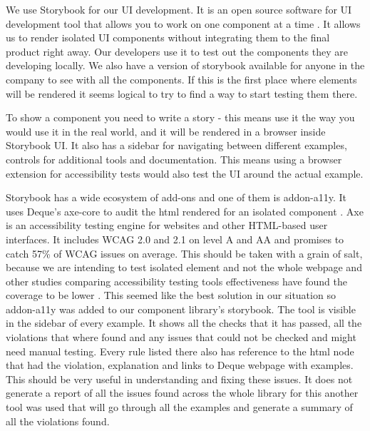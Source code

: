 \documentclass{master_thesis}
\begin{document}
We use Storybook for our UI development. It is an open source software for UI development tool that allows you to work on one component at a time \citep{storybook}. It allows us to render isolated UI components without integrating them to the final product right away. Our developers use it to test out the components they are developing locally. We also have a version of storybook available for anyone in the company to see with all the components. If this is the first place where elements will be rendered it seems logical to try to find a way to start testing them there.

To show a component you need to write a story - this means use it the way you would use it in the real world, and it will be rendered in a browser inside Storybook UI. It also has a sidebar for navigating between different examples, controls for additional tools and documentation. This means using a browser extension for accessibility tests would also test the UI around the actual example.

Storybook has a wide ecosystem of add-ons and one of them is addon-a11y. It uses Deque's axe-core to audit the html rendered for an isolated component \citep{addon-a11y}. Axe is an accessibility testing engine for websites and other HTML-based user interfaces. It includes WCAG 2.0 and 2.1 on level A and AA and promises to catch 57\% of WCAG issues on average. \citep{Deque2023} This should be taken with a grain of salt, because we are intending to test isolated element and not the whole webpage and other studies comparing accessibility testing tools effectiveness have found the coverage to be lower  .
This seemed like the best solution in our situation so addon-a11y was added to our component library's storybook. The tool is visible in the sidebar of every example. It shows all the checks that it has passed, all the violations that where found and any issues that could not be checked and might need manual testing. Every rule listed there also has reference to the html node that had the violation, explanation and links to Deque webpage with examples. This should be very useful in understanding and fixing these issues.
It does not generate a report of all the issues found across the whole library for this another tool was used that will go through all the examples and generate a summary of all the violations found.

\end{document}

